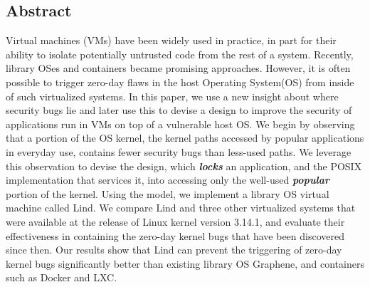 \subsection*{Abstract}

Virtual machines (VMs) have been widely used in practice, in part for their ability to
isolate potentially untrusted code from the rest of a system. 
Recently, library OSes and containers became promising approaches.  
%
However, it is often possible to trigger zero-day flaws
in the host Operating System(OS) from inside of such virtualized systems. 
%
In this paper, we use a new insight about where security bugs lie and later use
this to devise a design to improve the security of applications
run in VMs on top of a vulnerable host OS. 
We begin by observing that a portion of the OS kernel, the kernel paths accessed
by popular applications in everyday use, contains fewer security bugs than less-used paths. We
leverage this observation to devise the \lip design, which
\textbf{\textit{locks}} an application, and the POSIX implementation that services it, into
accessing only the well-used \textbf{\textit{popular}} portion of the kernel.  Using the \lip model, we
implement a library OS virtual machine called Lind. 
%
We compare Lind and three other virtualized systems that were
available at the release of Linux kernel version 3.14.1, and evaluate
their effectiveness in containing the zero-day kernel bugs that have been discovered
since then.
%
Our results show that Lind can prevent the triggering of zero-day kernel bugs significantly better 
than existing library OS Graphene, and containers such as Docker and LXC. 
